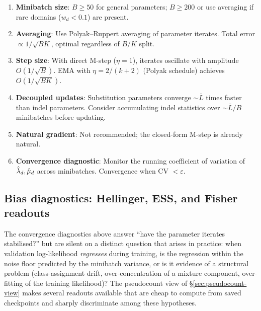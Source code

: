 \begin{enumerate}
\item \textbf{Minibatch size}: $B \geq 50$ for general parameters;
  $B \geq 200$ or use averaging if rare domains ($w_d < 0.1$) are present.
\item \textbf{Averaging}: Use Polyak--Ruppert averaging of parameter
  iterates. Total error $\propto 1/\sqrt{BK}$, optimal regardless
  of $B/K$ split.
\item \textbf{Step size}: With direct M-step ($\eta = 1$), iterates
  oscillate with amplitude $O(1/\sqrt{B})$.
  EMA with $\eta = 2/(k+2)$ (Polyak schedule) achieves $O(1/\sqrt{BK})$.
\item \textbf{Decoupled updates}: Substitution parameters converge
  $\sim \bar L$ times faster than indel parameters.
  Consider accumulating indel statistics over $\sim \bar L / B$ minibatches
  before updating.
\item \textbf{Natural gradient}: Not recommended; the closed-form M-step
  is already natural.
\item \textbf{Convergence diagnostic}: Monitor the running coefficient
  of variation of $\hat{\lambda}_d, \hat{\mu}_d$ across minibatches.
  Convergence when CV $< \varepsilon$.
\end{enumerate}

\subsection{Bias diagnostics: Hellinger, ESS, and Fisher readouts}
\label{sec:bias-diagnostics}

The convergence diagnostics above answer ``have the parameter iterates
stabilised?'' but are silent on a distinct question that arises in
practice: when validation log-likelihood \emph{regresses} during
training, is the regression within the noise floor predicted by the
minibatch variance, or is it evidence of a structural problem
(class-assignment drift, over-concentration of a mixture component,
over-fitting of the training likelihood)?  The pseudocount view of
\S\ref{sec:pseudocount-view} makes several readouts available that are
cheap to compute from saved checkpoints and sharply discriminate among
these hypotheses.


